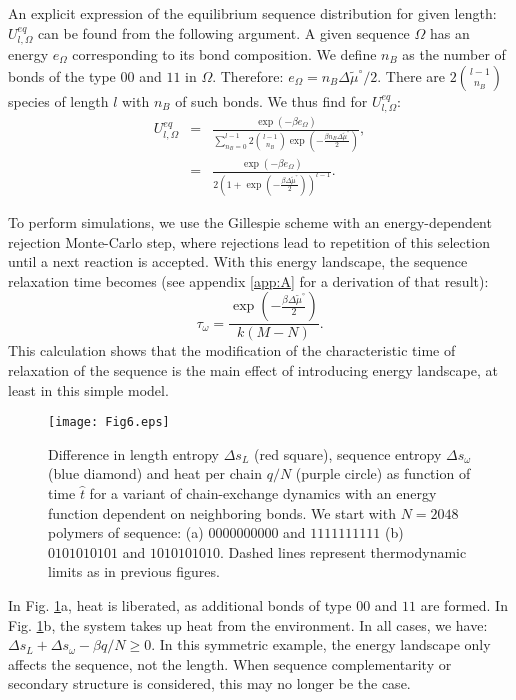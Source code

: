 \documentclass[
	amsmath,
	amssymb,
	a4paper,
	aip,		%
	jcp,		%
	reprint, twocolumn  %
	fleqn,
	showpacs,
	floatfix
]{revtex4-1}
\newcommand{\bea}{\begin{eqnarray}}
\newcommand{\eea}{\end{eqnarray}}
\begin{document}
An explicit expression of the equilibrium sequence distribution for given length: $U_{l,\Omega}^{eq}$ can be found from the following argument.
A given sequence $\Omega$ has an energy $e_\Omega$ corresponding to its bond composition. We define $n_B$ as 
the number of bonds of the type $00$ and $11$ in $\Omega$. Therefore: $e_{\Omega}= n_B \Delta \tilde{\mu}^\circ /2$. 
There are $2 {l-1 \choose n_B}$ species of length $l$ with $n_B$ of such bonds. We thus find for $U^{eq}_{l,\Omega}$:
\bea
U^{eq}_{l,\Omega}&=&\frac{\exp{ \left(-\beta e_\Omega \right) }}{\sum_{n_B=0}^{l-1}  2 {l-1 \choose n_B}\exp{ \left( -\frac{\beta n_B \Delta \tilde{\mu}^
\circ}{2} \right) }  } ,  \label{Uen} \nonumber \\
&=& \frac{\exp{ \left(-\beta e_\Omega \right) }}{ 2 \left(1+ \exp{ \left( -\frac{\beta \Delta \tilde{\mu}^\circ }{2}\right)} \right)^{l-1}   }.
\eea

To perform simulations, we use the Gillespie scheme with an energy-dependent rejection Monte-Carlo step,
 where rejections lead to repetition of this selection until a next reaction is accepted. With this energy landscape, the sequence  
relaxation time becomes (see appendix \ref{app:A} for a derivation of that result):
\begin{equation}
\label{tau-energy}
\tau_{\omega}=\frac{\exp{ \left( - \frac{\beta \Delta \tilde{\mu}^{\circ}}{2} \right) }} {k (M-N)}. 
\end{equation}
This calculation shows that the modification of the characteristic time of relaxation of the sequence is
the main effect of introducing energy landscape, at least in this simple model. 



\begin{figure}[H]
\centering
\texttt{[image: Fig6.eps]} 
\caption{Difference in length entropy $\Delta s_L$ (red square), sequence entropy $\Delta s_{\omega}$ (blue diamond) 
and heat per chain $q/N$ (purple circle) as function of time $\hat{t}$ for a variant of chain-exchange dynamics 
with an energy function dependent on neighboring bonds. We start with $N=2048$ polymers of sequence: 
(a) $0000000000$ and $1111111111$ (b) $0101010101$ and $1010101010$. Dashed lines represent thermodynamic limits as in previous figures.}
\label{TotdisstEN}
\end{figure}
In Fig. \ref{TotdisstEN}a, heat is liberated, as additional bonds of type $00$ and $11$ are formed. In Fig. \ref{TotdisstEN}b, the system takes up heat from the environment. 
In all cases, we have: $\Delta s_{L} + \Delta s_{\omega} - \beta q /N \geq 0$. In this symmetric example, the energy landscape only affects the sequence, 
not the length. When sequence complementarity or secondary structure is considered, this may no longer be the case.
\end{document}
